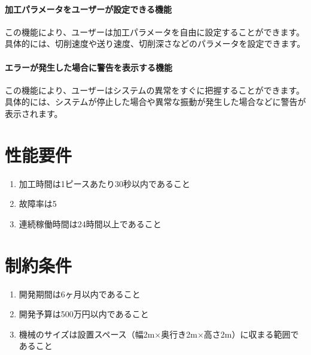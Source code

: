 \paragraph{加工パラメータをユーザーが設定できる機能}
この機能により、ユーザーは加工パラメータを自由に設定することができます。具体的には、切削速度や送り速度、切削深さなどのパラメータを設定できます。

\paragraph{エラーが発生した場合に警告を表示する機能}
この機能により、ユーザーはシステムの異常をすぐに把握することができます。具体的には、システムが停止した場合や異常な振動が発生した場合などに警告が表示されます。



\section{性能要件}
\begin{enumerate}
\item 加工時間は1ピースあたり30秒以内であること
\item 故障率は5%
\item 連続稼働時間は24時間以上であること
\end{enumerate}



\section{制約条件}
\begin{enumerate}
\item 開発期間は6ヶ月以内であること
\item 開発予算は500万円以内であること
\item 機械のサイズは設置スペース（幅2m×奥行き2m×高さ2m）に収まる範囲であること
\end{enumerate}




